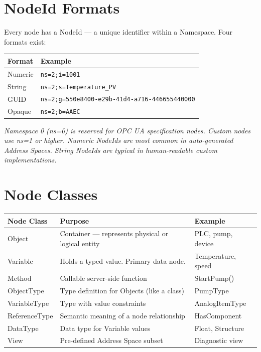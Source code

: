\documentclass[12pt,twoside,openright]{memoir}
\begin{document}
\section{NodeId Formats}

Every node has a NodeId --- a unique identifier within a Namespace. Four formats exist:

\begin{tcolorbox}[title={NodeId Format Examples}, colback=codebg, colframe=opcuanavy!50!black, arc=4pt]
\begin{tabular}{ll}
\textbf{Format} & \textbf{Example} \\
\hline
Numeric  & \texttt{ns=2;i=1001} \\
String   & \texttt{ns=2;s=Temperature\_PV} \\
GUID     & \texttt{ns=2;g=550e8400-e29b-41d4-a716-446655440000} \\
Opaque   & \texttt{ns=2;b=AAEC} \\
\end{tabular}

\medskip
\textit{Namespace 0 (ns=0) is reserved for OPC UA specification nodes. Custom nodes use ns=1 or higher.
Numeric NodeIds are most common in auto-generated Address Spaces. String NodeIds are typical in human-readable
custom implementations.}
\end{tcolorbox}

\section{Node Classes}

\begin{tabularx}{\textwidth}{lXl}
\toprule
\textbf{Node Class} & \textbf{Purpose} & \textbf{Example} \\
\midrule
\rowcolor{rowlight} Object & Container — represents physical or logical entity & PLC, pump, device \\
Variable & Holds a typed value. Primary data node. & Temperature, speed \\
\rowcolor{rowlight} Method & Callable server-side function & StartPump() \\
ObjectType & Type definition for Objects (like a class) & PumpType \\
\rowcolor{rowlight} VariableType & Type with value constraints & AnalogItemType \\
ReferenceType & Semantic meaning of a node relationship & HasComponent \\
\rowcolor{rowlight} DataType & Data type for Variable values & Float, Structure \\
View & Pre-defined Address Space subset & Diagnostic view \\
\bottomrule
\end{tabularx}
\end{document}
